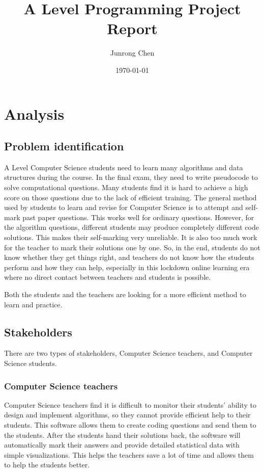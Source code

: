 \documentclass[a4paper]{report}
\title{A Level Programming Project Report}
\author{Junrong Chen}
\date{\today}
\begin{document}
\maketitle
\tableofcontents
\clearpage
\chapter{Analysis}

\section{Problem identification}

A Level Computer Science students need to learn many algorithms and data structures during the course. In the final exam, they need to write pseudocode to solve computational questions. Many students find it is hard to achieve a high score on those questions due to the lack of efficient training. The general method used by students to learn and revise for Computer Science is to attempt and self-mark past paper questions. This works well for ordinary questions. However, for the algorithm questions, different students may produce completely different code solutions. This makes their self-marking very unreliable. It is also too much work for the teacher to mark their solutions one by one. So, in the end, students do not know whether they get things right, and teachers do not know how the students perform and how they can help, especially in this lockdown online learning era where no direct contact between teachers and students is possible.

Both the students and the teachers are looking for a more efficient method to learn and practice.

\section{Stakeholders}

There are two types of stakeholders, Computer Science teachers, and Computer Science students.

\subsection{Computer Science teachers}

Computer Science teachers find it is difficult to monitor their students' ability to design and implement algorithms, so they cannot provide efficient help to their students. This software allows them to create coding questions and send them to the students. After the students hand their solutions back, the software will automatically mark their answers and provide detailed statistical data with simple visualizations. This helps the teachers save a lot of time and allows them to help the students better.
\end{document}

